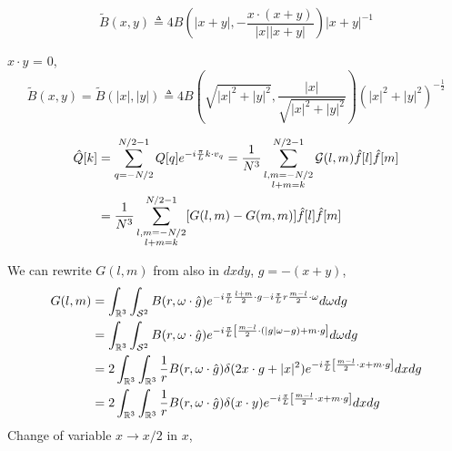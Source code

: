 \documentclass[11pt]{amsart}
\begin{document}
\begin{equation*}
\tilde{B}(x, y) \triangleq 4 B\left(|x+y|,-\frac{x \cdot(x+y)}{|x||x+y|}\right)|x+y|^{-1}
\end{equation*}

$x\cdot y$ = 0, 
\begin{equation*}
\tilde{B}(x, y)=\tilde{B}(|x|,|y|) \triangleq 4 B\left(\sqrt{|x|^{2}+|y|^{2}}, \frac{|x|}{\sqrt{|x|^{2}+|y|^{2}}}\right)\left(|x|^{2}+|y|^{2}\right)^{-\frac{1}{2}}\end{equation*}


\color{blue}
\begin{align*}\begin{split}
\hat Q[k] &=  \sum_{q=-N/2}^{N/2-1} Q[q]e^{-i{\pi \over L}k\cdot v_q}=   \frac{1}{N^3} \sum_{\substack{l,m= -N/2 \\ l+m = k}}^{N/2-1}\mathcal{G}(l,m)\hat f[l] \hat f[m]  \\
&= \frac{1}{N^3} \sum_{\substack{l,m= -N/2 \\ l+m = k}}^{N/2-1} [G(l,m) - G(m,m)]\hat f[l] \hat f[m]
\end{split}\end{align*}
\color{black}

We can rewrite $G(l,m)$ from \cite{gambaFastSpectralMethod2017} also in $dxdy$, $g = -(x+y)$, 
\begin{align*}
\begin{split}
G(l,m)  &= \int_{\mathbb{R}^3} \int_{\mathcal{S}^2}   B(r,\omega \cdot \hat g)  e^{-i{\pi \over L} \frac{l+m}{2} \cdot g -i {\pi \over L} r \frac{m-l}{2}\cdot \omega}d\omega dg \\
&= \int_{\mathbb{R}^3} \int_{\mathcal{S}^2}   B(r,\omega \cdot \hat g)  e^{-i\frac{\pi}{L}\left[\frac{m-l}{2}\cdot (|g|\omega - g) + m\cdot g\right]} d\omega dg \\
&= 2\int_{\mathbb{R}^3}\int_{\mathbb{R}^3} {1\over r} B(r,\omega \cdot \hat g)  \delta(2x\cdot g + |x|^2) e^{-i\frac{\pi}{L}\left[\frac{m-l}{2}\cdot x + m\cdot g\right]} dx dg \\
&= 2\int_{\mathbb{R}^3}\int_{\mathbb{R}^3}{1\over r} B(r,\omega \cdot \hat g)  \delta(x\cdot y) e^{-i\frac{\pi}{L}\left[\frac{m-l}{2}\cdot x + m\cdot g\right]} dx dg \\
\end{split}
\end{align*}
Change of variable $x \to x/2$ in $x$,
\end{document}
